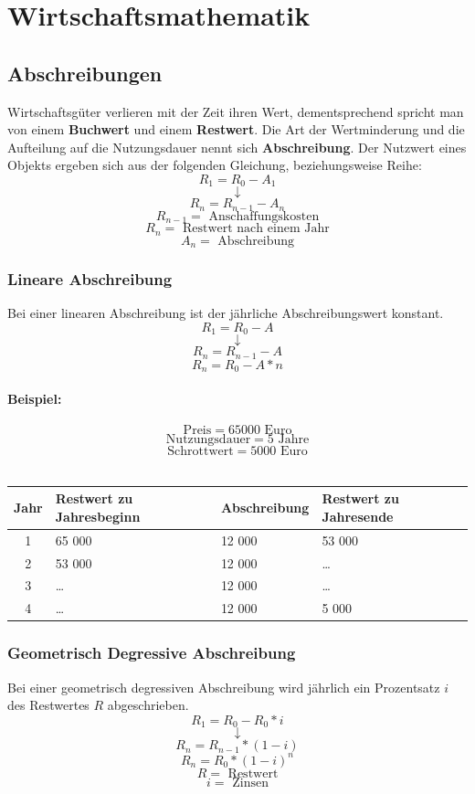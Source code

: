 \documentclass{school}
\begin{document}
\newpage

\section{Wirtschaftsmathematik}
\subsection{Abschreibungen}
Wirtschaftsgüter verlieren mit der Zeit ihren Wert, dementsprechend spricht man von einem \textbf{Buchwert} und einem \textbf{Restwert}.
Die Art der Wertminderung und die Aufteilung auf die Nutzungsdauer nennt sich \textbf{Abschreibung}.
Der Nutzwert eines Objekts ergeben sich aus der folgenden Gleichung, beziehungsweise Reihe:
$${R_1}={R_0}-{A_1}$$
$$\downarrow$$
$${R_n = R_{n-1} - A_n}$$
\vspace{0.5 em}
$$R_{n-1} =\text{ Anschaffungskosten}$$
$$R_{n} =\text{ Restwert nach einem Jahr}$$
$$A_{n} =\text{ Abschreibung}$$

\subsubsection{Lineare Abschreibung}
Bei einer linearen Abschreibung ist der jährliche Abschreibungswert konstant.
$$R_1 = R_0 - A$$
$$\downarrow$$
$$R_n = R_{n-1} - A$$
$$R_n = R_0 - A * n$$
\paragraph{Beispiel:}
$$\text{Preis} = 65 000\text{ Euro}$$
$$\text{Nutzungsdauer} = 5\text{ Jahre}$$
$$\text{Schrottwert} = 5000\text{ Euro}$$
\\
\begin{tabular}{c l l l}
\textbf{Jahr} & \textbf{Restwert zu Jahresbeginn} & \textbf{Abschreibung} & \textbf{Restwert zu Jahresende}\\
\midrule
1 & 65 000 & 12 000 & 53 000\\
2 & 53 000 & 12 000 & \dots \\
3 & \dots & 12 000 & \dots \\
4 & \dots & 12 000 & 5 000\\
\end{tabular}

\newpage
\subsubsection{Geometrisch Degressive Abschreibung}
Bei einer geometrisch degressiven Abschreibung wird jährlich ein Prozentsatz $i$ des Restwertes $R$ abgeschrieben.
$$R_1 = R_0 - R_0 * i$$
$$\downarrow$$
$$R_n = R_{n-1} * (1 - i)$$
$$R_n = R_0 * {(1 - i)}^n$$
\vspace{0.5 em}
$$R =\text{ Restwert}$$
$$i =\text{ Zinsen}$$
\end{document}
